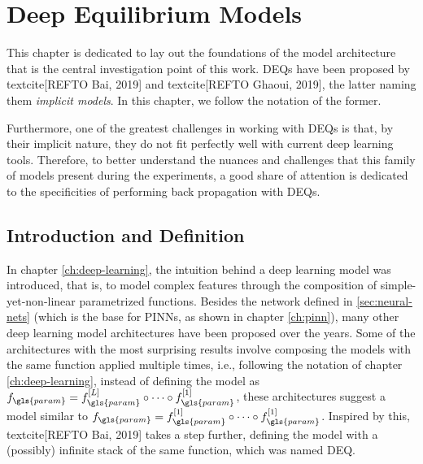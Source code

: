 \chapter{Deep Equilibrium Models}\label{ch:deq}

This chapter is dedicated to lay out the foundations of the model architecture that is the central investigation point of this work.
\gls{DEQ}s have been proposed by textcite[REFTO Bai, 2019] and textcite[REFTO Ghaoui, 2019], the latter naming them \emph{implicit models}.
In this chapter, we follow the notation of the former.

Furthermore, one of the greatest challenges in working with \gls{DEQ}s is that, by their implicit nature, they do not fit perfectly well with current deep learning tools.
Therefore, to better understand the nuances and challenges that this family of models present during the experiments, a good share of attention is dedicated to the specificities of performing back propagation with \gls{DEQ}s.

\section{Introduction and Definition}

In chapter \ref{ch:deep-learning}, the intuition behind a deep learning model was introduced, that is, to model complex features through the composition of simple-yet-non-linear parametrized functions.
Besides the network defined in \ref{sec:neural-nets} (which is the base for \gls{PINN}s, as shown in chapter \ref{ch:pinn}), many other deep learning model architectures have been proposed over the years.
    Some of the architectures with the most surprising results involve composing the models with the same function applied multiple times, i.e., following the notation of chapter \ref{ch:deep-learning}, instead of defining the model as $f_{\gls{param}}=f_{\gls{param}}^{[L]}\circ \cdots \circ f_{\gls{param}}^{[1]}$, these architectures suggest a model similar to $f_{\gls{param}}=f_{\gls{param}}^{[1]}\circ \cdots \circ f_{\gls{param}}^{[1]}$.
Inspired by this, textcite[REFTO Bai, 2019] takes a step further, defining the model with a (possibly) infinite stack of the same function, which was named \gls{DEQ}.

